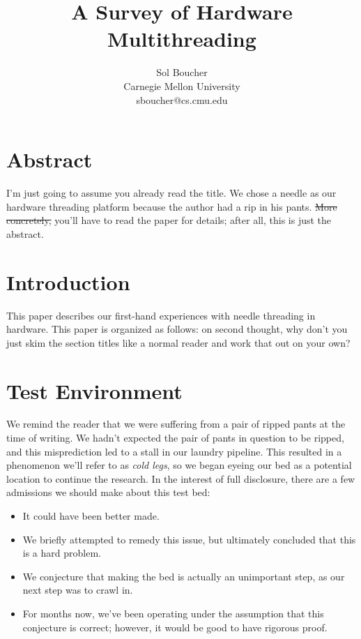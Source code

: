 \documentclass[letterpaper,12pt]{article}
\title{A Survey of Hardware Multithreading}
\author{Sol Boucher \\ Carnegie Mellon University \\ sboucher@cs.cmu.edu}
\date{}
\begin{document}
\maketitle
\thispagestyle{empty}
\begin{multicols}{2}

\section*{Abstract}
I'm just going to assume you already read the title.
We chose a needle as our hardware threading platform because the author had a rip in his pants.
\sout{More concretely,} you'll have to read the paper for details; after all, this is just the abstract.

\section{Introduction}
This paper describes our first-hand experiences with needle threading in hardware.
This paper is organized as follows:\@
on second thought, why don't you just skim the section titles like a normal reader and work that out on your own?

\section{Test Environment}
We remind the reader that we were suffering from a pair of ripped pants at the time of writing.
We hadn't expected the pair of pants in question to be ripped, and this misprediction led to a stall in our laundry pipeline.
This resulted in a phenomenon we'll refer to as \textit{cold legs}, so we began eyeing our bed as a potential location to continue the research.
In the interest of full disclosure, there are a few admissions we should make about this test bed:
\columnbreak
\begin{itemize}
\item It could have been better made.
\item We briefly attempted to remedy this issue, but ultimately concluded that this is a hard problem.
\item We conjecture that making the bed is actually an unimportant step, as our next step was to crawl in.
\item For months now, we've been operating under the assumption that this conjecture is correct; however, it would be good to have rigorous proof.
\end{itemize}


\end{multicols}
\end{document}
